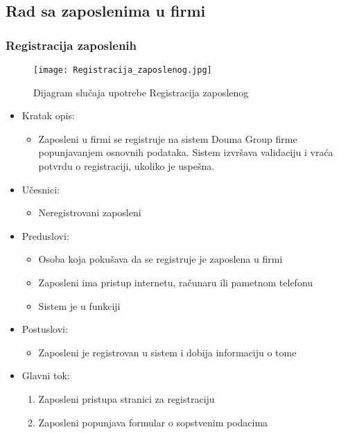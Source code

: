 \documentclass[a4paper]{article}
\begin{document}
\subsection{Rad sa zaposlenima u firmi}

\subsubsection{Registracija zaposlenih}

\begin{figure}[htp]
    \centering
    \texttt{[image: Registracija\_zaposlenog.jpg]}
    \caption{Dijagram slučaja upotrebe Registracija zaposlenog}
    \label{fig:RegistracijaZ}
\end{figure}

\begin{itemize}
    \item Kratak opis: 
    \begin{itemize}
        \item Zaposleni u firmi se registruje na sistem Douma Group firme popunjavanjem osnovnih podataka. Sistem izvršava validaciju i vraća potvrdu o registraciji, ukoliko je uspešna.
    \end{itemize}
    \item Učesnici:
        \begin{itemize}
        \item Neregistrovani zaposleni
    \end{itemize}
    \item Preduslovi:
        \begin{itemize}
            \item Osoba koja pokušava da se registruje je zaposlena u firmi
            \item Zaposleni ima pristup internetu, računaru ili pametnom telefonu
            \item Sistem je u funkciji
        \end{itemize}
    \item Postuslovi:
        \begin{itemize}
            \item Zaposleni je registrovan u sistem i dobija informaciju o tome
        \end{itemize}
    \item Glavni tok:
        \begin{enumerate}
            \item Zaposleni pristupa stranici za registraciju
            \item Zaposleni popunjava formular o sopstvenim podacima 

\end{enumerate}
\end{itemize}
\end{document}
